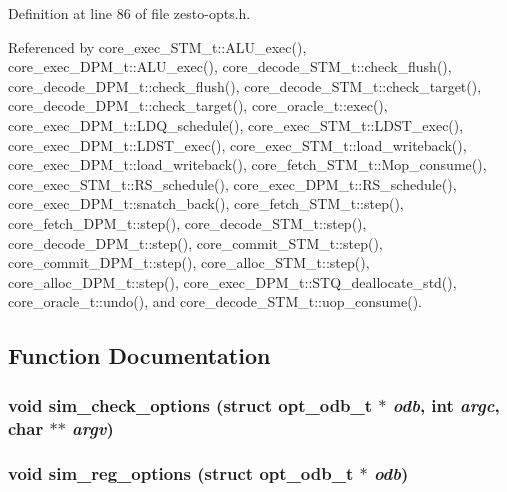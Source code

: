 Definition at line 86 of file zesto-opts.h.

Referenced by core\_\-exec\_\-STM\_\-t::ALU\_\-exec(), core\_\-exec\_\-DPM\_\-t::ALU\_\-exec(), core\_\-decode\_\-STM\_\-t::check\_\-flush(), core\_\-decode\_\-DPM\_\-t::check\_\-flush(), core\_\-decode\_\-STM\_\-t::check\_\-target(), core\_\-decode\_\-DPM\_\-t::check\_\-target(), core\_\-oracle\_\-t::exec(), core\_\-exec\_\-DPM\_\-t::LDQ\_\-schedule(), core\_\-exec\_\-STM\_\-t::LDST\_\-exec(), core\_\-exec\_\-DPM\_\-t::LDST\_\-exec(), core\_\-exec\_\-STM\_\-t::load\_\-writeback(), core\_\-exec\_\-DPM\_\-t::load\_\-writeback(), core\_\-fetch\_\-STM\_\-t::Mop\_\-consume(), core\_\-exec\_\-STM\_\-t::RS\_\-schedule(), core\_\-exec\_\-DPM\_\-t::RS\_\-schedule(), core\_\-exec\_\-DPM\_\-t::snatch\_\-back(), core\_\-fetch\_\-STM\_\-t::step(), core\_\-fetch\_\-DPM\_\-t::step(), core\_\-decode\_\-STM\_\-t::step(), core\_\-decode\_\-DPM\_\-t::step(), core\_\-commit\_\-STM\_\-t::step(), core\_\-commit\_\-DPM\_\-t::step(), core\_\-alloc\_\-STM\_\-t::step(), core\_\-alloc\_\-DPM\_\-t::step(), core\_\-exec\_\-DPM\_\-t::STQ\_\-deallocate\_\-std(), core\_\-oracle\_\-t::undo(), and core\_\-decode\_\-STM\_\-t::uop\_\-consume().

\subsection{Function Documentation}
\subsubsection[{sim\_\-check\_\-options}]{\setlength{\rightskip}{0pt plus 5cm}void sim\_\-check\_\-options (struct {\bf opt\_\-odb\_\-t} $\ast$ {\em odb}, \/  int {\em argc}, \/  char $\ast$$\ast$ {\em argv})}\label{zesto-opts_8h_d6c7eccd0fa4b587be632b532e3b3e04}


\subsubsection[{sim\_\-reg\_\-options}]{\setlength{\rightskip}{0pt plus 5cm}void sim\_\-reg\_\-options (struct {\bf opt\_\-odb\_\-t} $\ast$ {\em odb})}\label{zesto-opts_8h_4452f31e857cb0adc1cd9ecc3be5f2ee}




